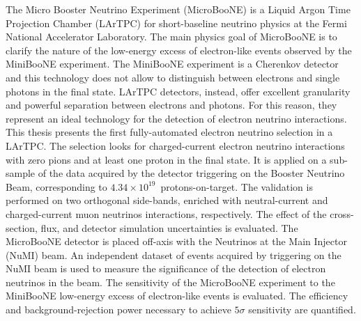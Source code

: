The Micro Booster Neutrino Experiment (MicroBooNE) is a Liquid Argon Time Projection Chamber (LArTPC) for short-baseline neutrino physics at the Fermi National Accelerator Laboratory. The main physics goal of MicroBooNE is to clarify the nature of the low-energy excess of electron-like events observed by the MiniBooNE experiment.
The MiniBooNE experiment is a Cherenkov detector and this technology does not allow to distinguish between electrons and single photons in the final state. 
LArTPC detectors, instead, offer excellent granularity and powerful separation between electrons and photons. For this reason, they represent an ideal technology for the detection of electron neutrino interactions.
This thesis presents the first fully-automated electron neutrino selection in a LArTPC. The selection looks for charged-current electron neutrino interactions with zero pions and at least one proton in the final state. It is applied on a sub-sample of the data acquired by the detector triggering on the Booster Neutrino Beam, corresponding to $4.34\times10^{19}$~protons-on-target. The validation is performed on two orthogonal side-bands, enriched with neutral-current and charged-current muon neutrinos interactions, respectively. The effect of the cross-section, flux, and detector simulation uncertainties is evaluated. 
The MicroBooNE detector is placed off-axis with the Neutrinos at the Main Injector (NuMI) beam. An independent dataset of events acquired by triggering on the NuMI beam is used to measure the significance of the detection of electron neutrinos in the beam. 
The sensitivity of the MicroBooNE experiment to the MiniBooNE low-energy excess of electron-like events is evaluated. The efficiency and background-rejection power necessary to achieve $5\sigma$ sensitivity are quantified.
